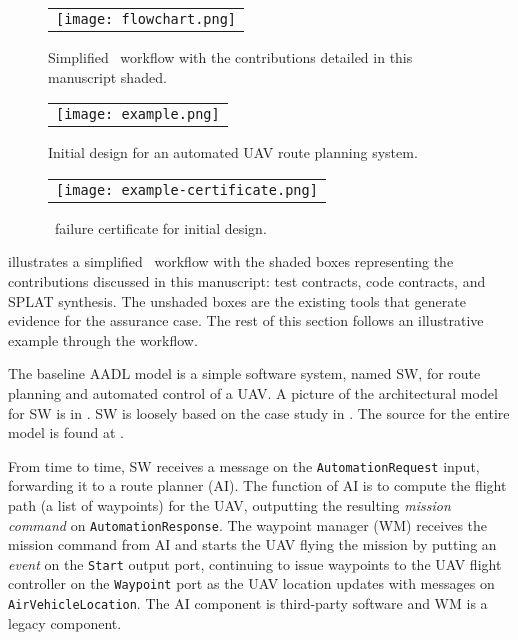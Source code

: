\begin{figure*}
  \begin{center}
    \begin{tabular}{c}
      \texttt{[image: flowchart.png]} \\
    \end{tabular}
  \end{center}
\caption{Simplified \brfcs\ workflow with the contributions detailed in this manuscript shaded.}
\label{fig:flowchart}
\end{figure*}

\begin{figure*}[h]
  \begin{center}
    \begin{tabular}{c}
      \texttt{[image: example.png]}
    \end{tabular}
  \end{center}
\caption{Initial design for an automated UAV route planning system.}
\label{fig:example}
\end{figure*}

\begin{figure}
  \begin{center}
    \begin{tabular}{c}
      \texttt{[image: example-certificate.png]} \\
    \end{tabular}
  \end{center}
\caption{\agr\ failure certificate for initial design.}
\label{fig:example-certificate}
\end{figure}

 illustrates a simplified \brfcs\ workflow with the shaded boxes representing the contributions discussed in this manuscript: test contracts, code contracts, and SPLAT synthesis.
The unshaded boxes are the existing tools that generate evidence for the assurance case.
The rest of this section follows an illustrative example through the workflow.

The baseline AADL model is a simple software system, named SW, for route planning
and automated control of a UAV. A picture of the architectural
model for SW is in . SW is loosely based on
the case study in .  The source for the
entire model is found at \cite{repo}.

From time to time, SW receives a message on the \texttt{AutomationRequest} input,
forwarding it to a route planner (AI). The function of AI is to 
compute the flight path (a list of waypoints) for the UAV, outputting
the resulting \emph{mission command} on \texttt{AutomationResponse}.
The waypoint manager (WM) receives the mission command from AI and
starts the UAV flying the mission by putting an \emph{event} on the
\texttt{Start} output port, continuing to issue waypoints to the UAV
flight controller on the \texttt{Waypoint} port as the UAV location
updates with messages on \texttt{AirVehicleLocation}.
The AI component is third-party
software and WM is a legacy component.

